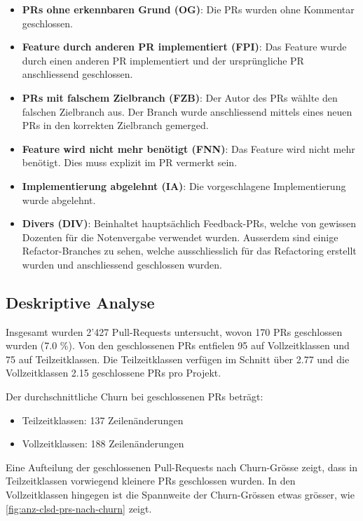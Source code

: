 \begin{itemize}
    \item \textbf{PRs ohne erkennbaren Grund (OG)}: Die PRs wurden ohne Kommentar geschlossen.
    \item \textbf{Feature durch anderen PR implementiert (FPI)}: Das Feature wurde durch einen anderen PR implementiert und der ursprüngliche PR anschliessend geschlossen.
    \item \textbf{PRs mit falschem Zielbranch (FZB)}: Der Autor des PRs wählte den falschen Zielbranch aus. Der Branch wurde anschliessend mittels eines neuen PRs in den korrekten Zielbranch gemerged.
    \item \textbf{Feature wird nicht mehr benötigt (FNN)}: Das Feature wird nicht mehr benötigt. Dies muss explizit im PR vermerkt sein.
    \item \textbf{Implementierung abgelehnt (IA)}: Die vorgeschlagene Implementierung wurde abgelehnt.
    \item \textbf{Divers (DIV)}: Beinhaltet hauptsächlich Feedback-PRs, welche von gewissen Dozenten für die Notenvergabe verwendet wurden. Ausserdem sind einige Refactor-Branches zu sehen, welche ausschliesslich für das Refactoring erstellt wurden und anschliessend geschlossen wurden. 
\end{itemize}


\subsection{Deskriptive Analyse}
Insgesamt wurden 2'427 Pull-Requests untersucht, wovon 170 PRs geschlossen wurden (7.0 \%). Von den geschlossenen PRs entfielen 95 auf Vollzeitklassen und 75 auf Teilzeitklassen. Die Teilzeitklassen verfügen im Schnitt über 2.77 und die Vollzeitklassen 2.15 geschlossene PRs pro Projekt. 

Der durchschnittliche Churn bei geschlossenen PRs beträgt: \begin{itemize} \item Teilzeitklassen: 137 Zeilenänderungen \item Vollzeitklassen: 188 Zeilenänderungen \end{itemize}

Eine Aufteilung der geschlossenen Pull-Requests nach Churn-Grösse zeigt, dass in Teilzeitklassen vorwiegend kleinere PRs geschlossen wurden. In den Vollzeitklassen hingegen ist die Spannweite der Churn-Grössen etwas grösser, wie \autoref{fig:anz-clsd-prs-nach-churn} zeigt.

